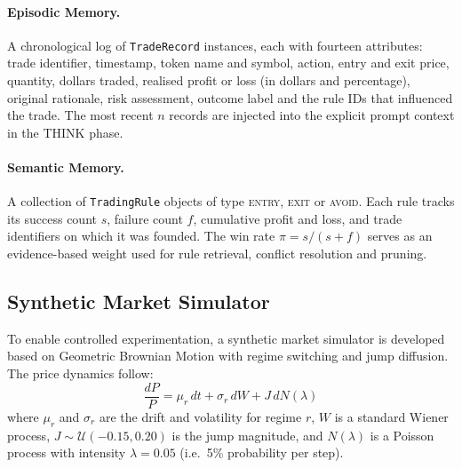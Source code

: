 \documentclass[12pt,a4paper,oneside,openany]{book}
\begin{document}
\paragraph{Episodic Memory.} A chronological log of \texttt{TradeRecord} instances, each with fourteen attributes: trade identifier, timestamp, token name and symbol, action, entry and exit price, quantity, dollars traded, realised profit or loss (in dollars and percentage), original rationale, risk assessment, outcome label and the rule IDs that influenced the trade. The most recent $n$ records are injected into the explicit prompt context in the THINK phase.

\paragraph{Semantic Memory.} A collection of \texttt{TradingRule} objects of type \textsc{entry}, \textsc{exit} or \textsc{avoid}. Each rule tracks its success count $s$, failure count $f$, cumulative profit and loss, and trade identifiers on which it was founded. The win rate $\pi = s / (s + f)$ serves as an evidence-based weight used for rule retrieval, conflict resolution and pruning.

\subsection{Synthetic Market Simulator}
To enable controlled experimentation, a synthetic market simulator is developed based on Geometric Brownian Motion with regime switching and jump diffusion. The price dynamics follow:
\begin{equation}
\frac{dP}{P} = \mu_r\, dt + \sigma_r\, dW + J\, dN(\lambda)
\end{equation}
where $\mu_r$ and $\sigma_r$ are the drift and volatility for regime $r$, $W$ is a standard Wiener process, $J \sim \mathcal{U}(-0.15, 0.20)$ is the jump magnitude, and $N(\lambda)$ is a Poisson process with intensity $\lambda = 0.05$ (i.e.\ 5\% probability per step).
\end{document}
